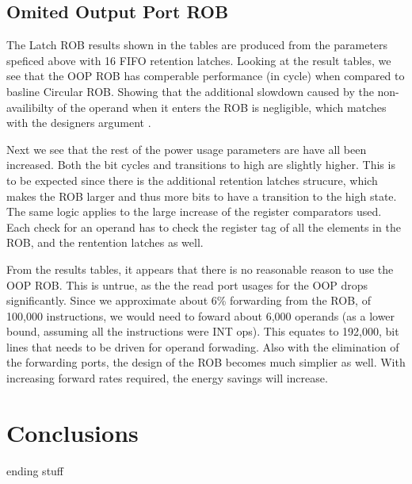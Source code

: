 \subsection{Omited Output Port ROB}
The Latch ROB results shown in the tables are produced from the parameters 
speficed above with 16 FIFO retention latches. Looking at the result tables,
 we see that the OOP ROB has comperable performance (in cycle) when compared 
to basline Circular ROB.  Showing that the additional slowdown caused by the
 non-availibilty of the operand when it enters the ROB is negligible, which
matches with the designers argument \cite{kucuk}.  

Next we see that the rest of the power usage parameters are have all been 
increased.  Both the bit cycles and transitions to high are slightly higher.
This is to be expected since there is the additional retention latches 
strucure, which makes the ROB larger and thus more bits to have a transition
to the high state.  The same logic applies to the large increase of the
register comparators used.  Each check for an operand has to check the
register tag of all the elements in the ROB, and the rentention latches 
as well.  

From the results tables, it appears that there is no reasonable reason to use
the OOP ROB.  This is untrue, as the the read port usages for the OOP drops
significantly.  Since we approximate about 6\% forwarding from the ROB, of 
100,000 instructions, we would need to foward about 6,000 operands (as a
lower bound, assuming all the instructions were INT ops).  This equates to
192,000, bit lines that needs to be driven for operand forwading.  Also with
the elimination of the forwarding ports, the design of the ROB becomes much 
simplier as well. With increasing forward rates required, the energy savings
will increase.


\section{Conclusions}
ending stuff
